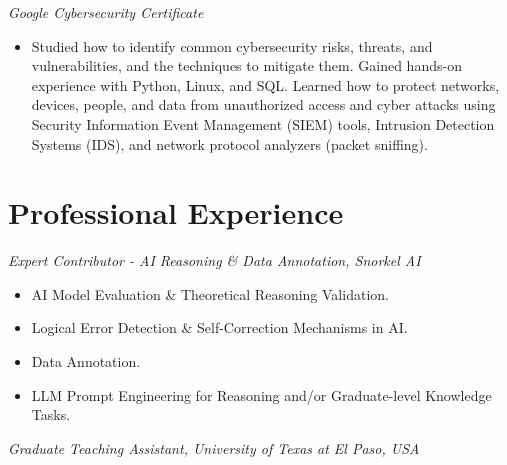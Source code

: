 \documentclass[11pt,a4paper]{article}
\begin{document}
\vspace{10pt}



\noindent \textit{\large Google Cybersecurity Certificate}

\begin{itemize}[noitemsep, leftmargin=*]

    \item Studied how to identify common cybersecurity risks, threats, and vulnerabilities, and the techniques to mitigate them. Gained hands-on experience with Python, Linux, and SQL. Learned how to protect networks, devices, people, and data from unauthorized access and cyber attacks using Security Information Event Management (SIEM) tools, Intrusion Detection Systems (IDS), and network protocol analyzers (packet sniffing).

\end{itemize}



\vspace{20pt}


\section*{\textbf{Professional Experience}}



\noindent \textit{\large Expert Contributor - AI Reasoning \& Data Annotation, Snorkel AI}

\begin{itemize}[noitemsep, itemsep=4pt, leftmargin=*]

    \item AI Model Evaluation \& Theoretical Reasoning Validation.

    \item Logical Error Detection \& Self-Correction Mechanisms in AI.

    \item Data Annotation.

    \item LLM Prompt Engineering for Reasoning and/or Graduate-level Knowledge Tasks.

\end{itemize}



\vspace{10pt}



\noindent \textit{\large Graduate Teaching Assistant, University of Texas at El Paso, USA}
\end{document}
